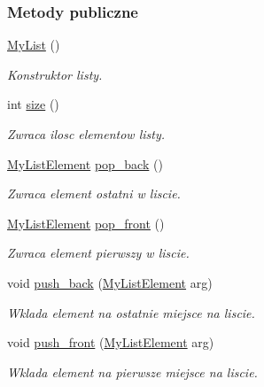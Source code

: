 \subsubsection*{Metody publiczne}
\begin{DoxyCompactItemize}
\item 
\hyperlink{class_my_list_ae9cd2a6b068e02fa39ba3e539425c1c1}{My\-List} ()
\begin{DoxyCompactList}\small\item\em Konstruktor listy. \end{DoxyCompactList}\item 
int \hyperlink{class_my_list_a6d21c8bfbd9cd31efdba81ba488f43f2}{size} ()
\begin{DoxyCompactList}\small\item\em Zwraca ilosc elementow listy. \end{DoxyCompactList}\item 
\hyperlink{class_my_list_1_1_my_list_element}{My\-List\-Element} \hyperlink{class_my_list_afc006104d8156154ad3849d0e4cc6109}{pop\-\_\-back} ()
\begin{DoxyCompactList}\small\item\em Zwraca element ostatni w liscie. \end{DoxyCompactList}\item 
\hyperlink{class_my_list_1_1_my_list_element}{My\-List\-Element} \hyperlink{class_my_list_a84369accd705913f85b770770f06767a}{pop\-\_\-front} ()
\begin{DoxyCompactList}\small\item\em Zwraca element pierwszy w liscie. \end{DoxyCompactList}\item 
void \hyperlink{class_my_list_a06c2749553f559eb3d5d227e0ac07c53}{push\-\_\-back} (\hyperlink{class_my_list_1_1_my_list_element}{My\-List\-Element} arg)
\begin{DoxyCompactList}\small\item\em Wklada element na ostatnie miejsce na liscie. \end{DoxyCompactList}\item 
void \hyperlink{class_my_list_ac703cd9be1c465722e683dbdcececa6b}{push\-\_\-front} (\hyperlink{class_my_list_1_1_my_list_element}{My\-List\-Element} arg)
\begin{DoxyCompactList}\small\item\em Wklada element na pierwsze miejsce na liscie. \end{DoxyCompactList}\item 

\end{DoxyCompactItemize}
